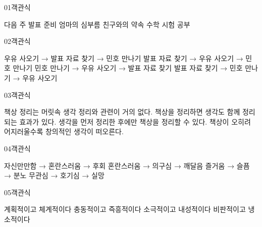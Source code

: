 \documentclass[fs11,seriesFre]{korfarm-base}
\begin{document}
\kfActivityBg \par{}\par\nopagebreak[4]\smallskip\nopagebreak[4]


\begin{kfQBlock}{01}{객관식}
\begin{kfChoices}
\kfChoice 다음 주 발표 준비
\kfChoice 엄마의 심부름
\kfChoice 친구와의 약속
\kfChoice 수학 시험 공부
\end{kfChoices}
\end{kfQBlock}
\begin{kfQBlock}{02}{객관식}
\begin{kfChoices}
\kfChoice 우유 사오기 → 발표 자료 찾기 → 민호 만나기
\kfChoice 발표 자료 찾기 → 우유 사오기 → 민호 만나기
\kfChoice 민호 만나기 → 우유 사오기 → 발표 자료 찾기
\kfChoice 발표 자료 찾기 → 민호 만나기 → 우유 사오기
\end{kfChoices}
\end{kfQBlock}
\begin{kfQBlock}{03}{객관식}
\begin{kfChoices}
\kfChoice 책상 정리는 머릿속 생각 정리와 관련이 거의 없다.
\kfChoice 책상을 정리하면 생각도 함께 정리되는 효과가 있다.
\kfChoice 생각을 먼저 정리한 후에만 책상을 정리할 수 있다.
\kfChoice 책상이 오히려 어지러울수록 창의적인 생각이 떠오른다.
\end{kfChoices}
\end{kfQBlock}
\begin{kfQBlock}{04}{객관식}
\begin{kfChoices}
\kfChoice 자신만만함 → 혼란스러움 → 후회
\kfChoice 혼란스러움 → 의구심 → 깨달음
\kfChoice 즐거움 → 슬픔 → 분노
\kfChoice 무관심 → 호기심 → 실망
\end{kfChoices}
\end{kfQBlock}
\begin{kfQBlock}{05}{객관식}
\begin{kfChoices}
\kfChoice 계획적이고 체계적이다
\kfChoice 충동적이고 즉흥적이다
\kfChoice 소극적이고 내성적이다
\kfChoice 비판적이고 냉소적이다
\end{kfChoices}
\end{kfQBlock}
\end{document}

